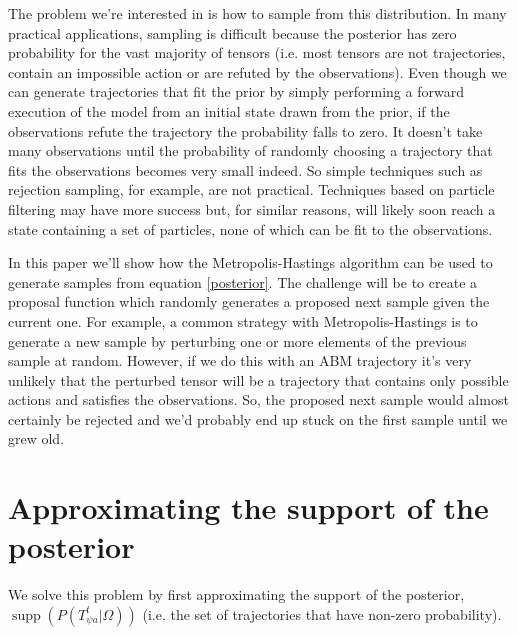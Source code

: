 \documentclass{article}
\DeclareMathOperator\supp{supp}
\begin{document}
The problem we're interested in is how to sample from this distribution. In many practical applications, sampling is difficult because the posterior has zero probability for the vast majority of tensors (i.e. most tensors are not trajectories, contain an impossible action or are refuted by the observations). Even though we can generate trajectories that fit the prior by simply performing a forward execution of the model from an initial state drawn from the prior, if the observations refute the trajectory the probability falls to zero. It doesn't take many observations until the probability of randomly choosing a trajectory that fits the observations becomes very small indeed. So simple techniques such as rejection sampling, for example, are not practical. Techniques based on particle filtering may have more success but, for similar reasons, will likely soon reach a state containing a set of particles, none of which can be fit to the observations.

In this paper we'll show how the Metropolis-Hastings algorithm can be used to generate samples from equation \eqref{posterior}. The challenge will be to create a proposal function which randomly generates a proposed next sample given the current one. For example, a common strategy with Metropolis-Hastings is to generate a new sample by perturbing one or more elements of the previous sample at random. However, if we do this with an ABM trajectory it's very unlikely that the perturbed tensor will be a trajectory that contains only possible actions and satisfies the observations. So, the proposed next sample would almost certainly be rejected and we'd probably end up stuck on the first sample until we grew old.

\section{Approximating the support of the posterior}

We solve this problem by first approximating the support of the posterior, $\supp(P(T^t_{\psi a}|\Omega))$ (i.e. the set of trajectories that have non-zero probability).
\end{document}
